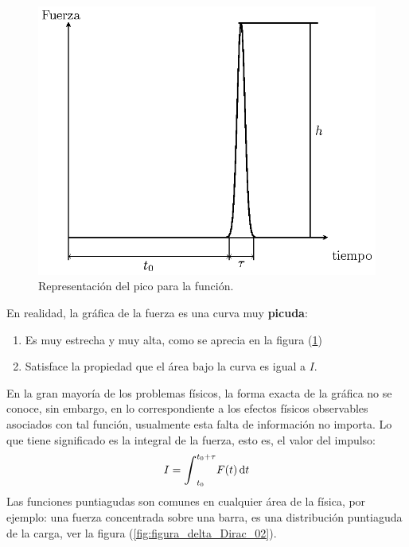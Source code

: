 \documentclass[12pt]{article}
\def\scaleint#1{\vcenter{\hbox{\scaleto[3ex]{\displaystyle\int}{#1}}}}
\numberwithin{equation}{section}
\begin{document}
\begin{figure}[H]
    \centering
    \includegraphics[scale=1]{Imagenes/delta_Dirac_01.eps}
    \caption{Representación del pico para la función.}
    \label{fig:delta_Dirac_01}
\end{figure}
En realidad, la gráfica de la fuerza es una curva muy \textbf{picuda}:
\begin{enumerate}
\item Es muy estrecha y muy alta, como se aprecia en la figura (\ref{fig:delta_Dirac_01})
\item Satisface la propiedad que el área bajo la curva es igual a $I$.
\end{enumerate}
En la gran mayoría de los problemas físicos, la forma exacta de la gráfica no se conoce,  sin embargo, en lo correspondiente a los efectos físicos observables asociados con tal función, usualmente esta falta de información no importa. Lo que tiene significado es la integral de la fuerza, esto es, el valor del impulso:
\begin{align*}
I = \scaleint{6ex}_{t_{0}}^{t_{0} + \tau } F (t) \dd{t}
\end{align*}
Las funciones puntiagudas son comunes en cualquier área de la física,  por ejemplo: una fuerza concentrada sobre una barra, es una distribución puntiaguda de la carga, ver la figura (\ref{fig:figura_delta_Dirac_02}). 
\end{document}
